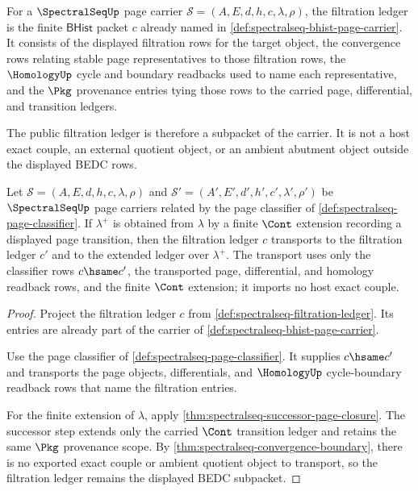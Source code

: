 \begin{definition}
\label{def:spectralseq-filtration-ledger}
For a $\SpectralSeqUp$ page carrier
$\mathcal S=(A,E,d,h,c,\lambda,\rho)$, the filtration ledger is the finite
$\mathsf{BHist}$ packet $c$ already named in
\autoref{def:spectralseq-bhist-page-carrier}. It consists of the displayed
filtration rows for the target object, the convergence rows relating stable
page representatives to those filtration rows, the $\HomologyUp$ cycle and
boundary readbacks used to name each representative, and the $\Pkg$
provenance entries tying those rows to the carried page, differential, and
transition ledgers.

The public filtration ledger is therefore a subpacket of the carrier. It is
not a host exact couple, an external quotient object, or an ambient abutment
object outside the displayed BEDC rows.
\end{definition}

\begin{theorem}
\label{thm:spectralseq-filtration-transport}
Let $\mathcal S=(A,E,d,h,c,\lambda,\rho)$ and
$\mathcal S'=(A',E',d',h',c',\lambda',\rho')$ be $\SpectralSeqUp$ page
carriers related by the page classifier of
\autoref{def:spectralseq-page-classifier}. If $\lambda^+$ is obtained from
$\lambda$ by a finite $\Cont$ extension recording a displayed page
transition, then the filtration ledger $c$ transports to the filtration ledger
$c'$ and to the extended ledger over $\lambda^+$. The transport uses only the
classifier rows $c\hsame c'$, the transported page, differential, and homology
readback rows, and the finite $\Cont$ extension; it imports no host exact
couple.
\end{theorem}
\begin{proof}
Project the filtration ledger $c$ from
\autoref{def:spectralseq-filtration-ledger}. Its entries are already part of
the carrier of \autoref{def:spectralseq-bhist-page-carrier}.

Use the page classifier of \autoref{def:spectralseq-page-classifier}. It
supplies $c\hsame c'$ and transports the page objects, differentials, and
$\HomologyUp$ cycle-boundary readback rows that name the filtration entries.

For the finite extension of $\lambda$, apply
\autoref{thm:spectralseq-successor-page-closure}. The successor step extends
only the carried $\Cont$ transition ledger and retains the same $\Pkg$
provenance scope. By \autoref{thm:spectralseq-convergence-boundary}, there is
no exported exact couple or ambient quotient object to transport, so the
filtration ledger remains the displayed BEDC subpacket.
\end{proof}

